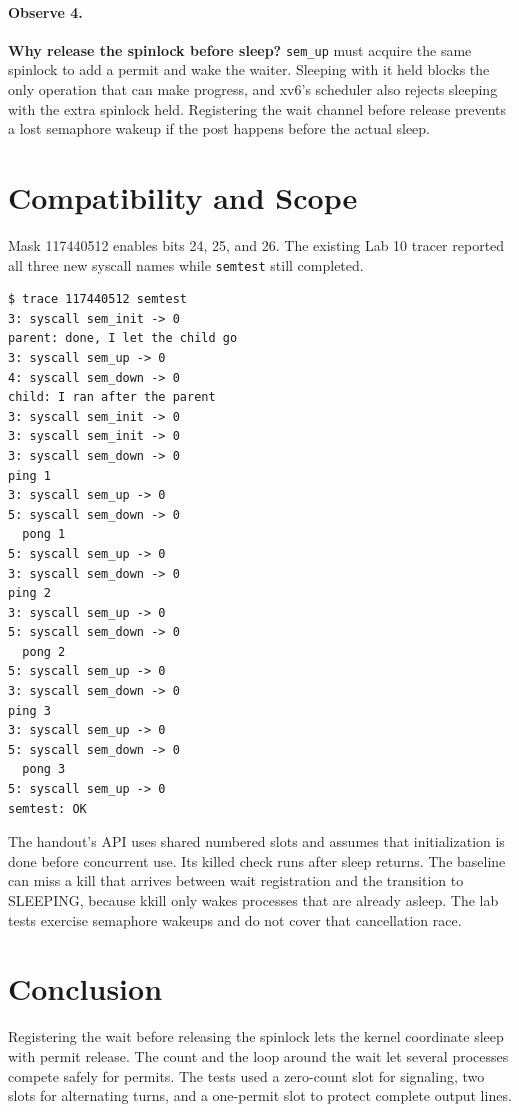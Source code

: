 \documentclass[12pt,a4paper]{article}
\begin{document}
\paragraph{Observe 4.} \textbf{Why release the spinlock before sleep?} \texttt{sem\_up} must acquire the same spinlock to add a permit and wake the waiter. Sleeping with it held blocks the only operation that can make progress, and xv6's scheduler also rejects sleeping with the extra spinlock held. Registering the wait channel before release prevents a lost semaphore wakeup if the post happens before the actual sleep.

\section{Compatibility and Scope}
Mask 117440512 enables bits 24, 25, and 26. The existing Lab 10 tracer reported
all three new syscall names while \texttt{semtest} still completed.

\begin{lstlisting}[caption={The new calls selected by the Lab 10 trace mask}]
$ trace 117440512 semtest
3: syscall sem_init -> 0
parent: done, I let the child go
3: syscall sem_up -> 0
4: syscall sem_down -> 0
child: I ran after the parent
3: syscall sem_init -> 0
3: syscall sem_init -> 0
3: syscall sem_down -> 0
ping 1
3: syscall sem_up -> 0
5: syscall sem_down -> 0
  pong 1
5: syscall sem_up -> 0
3: syscall sem_down -> 0
ping 2
3: syscall sem_up -> 0
5: syscall sem_down -> 0
  pong 2
5: syscall sem_up -> 0
3: syscall sem_down -> 0
ping 3
3: syscall sem_up -> 0
5: syscall sem_down -> 0
  pong 3
5: syscall sem_up -> 0
semtest: OK
\end{lstlisting}

The handout's API uses shared numbered slots and assumes that initialization is done before concurrent use. Its killed check runs after sleep returns. The baseline can miss a kill that arrives between wait registration and the transition to SLEEPING, because kkill only wakes processes that are already asleep. The lab tests exercise semaphore wakeups and do not cover that cancellation race.

\section{Conclusion}
Registering the wait before releasing the spinlock lets the kernel coordinate
sleep with permit release. The count and the loop around the wait let several
processes compete safely for permits. The tests used a zero-count slot for
signaling, two slots for alternating turns, and a one-permit slot to protect
complete output lines.
\end{document}

